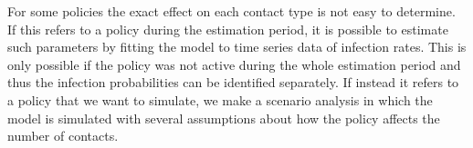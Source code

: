 For some policies the exact effect on each contact type is not easy to determine. If this refers to a policy during the estimation period, it is possible to estimate such parameters by fitting the model to time series data of infection rates. This is only possible if the policy was not active during the whole estimation period and thus the infection probabilities can be identified separately. If instead it refers to a policy that we want to simulate, we make a scenario analysis in which the model is simulated with several assumptions about how the policy affects the number of contacts.
